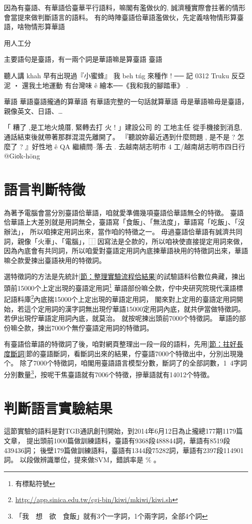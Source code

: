 \documentclass[final,oneside,onecolumn,12pt,a4paper]{book}%
\begin{document}
因為有臺語、有華語佮臺華平行語料，嘛閣有濫做伙的, 誠濟種實際會拄著的情形會當提來做判斷語言的語料。
有的時陣臺語佮華語濫做伙，先定義啥物情形算臺語，啥物情形算華語

用人工分

主要語句是臺語，有一兩个詞是華語嘛是算臺語
臺語

聽人講 khah 早有出現過『小蜜蜂』
我 beh tńg 來種作 ! ── 記 0312 Truku 反亞泥 ‧ 還我土地運動
有台灣味 ê 繪本──《我和我的腳踏車》 .

華語
華語臺語攏通的算華語
有華語完整的一句話就算華語
毋是華語嘛毋是臺語，親像英文、日語、…

「 糟了 ,是工地火燒厝, 緊轉去打 火 ! 」建設公司 的 工地主任 從手機接到消息,通話結束後就帶著那群混混先離開了。
『聽說妳最近遇到什麼問題 , 是不是 ? 怎麼了 ? 』好性地 ê QA 繼續問--落-去 .
去越南胡志明市 4 工/越南胡志明市四日行 @Gio̍k-hōng


\section{語言判斷特徵}
\label{節：語言判斷特徵}
為著予電腦會當分別臺語佮華語，咱就愛準備幾項臺語佮華語無仝的特徵。
臺語佮華語上大差別就是用詞無仝，臺語寫「食飯」、「無法度」，華語寫「吃飯」、「沒辦法」，
所以咱揀定用詞出來，當作咱的特徵之一。
毋過臺語佮華語有誠濟共同詞，親像「火車」、「電腦」，⿰因寫法是仝款的，所以咱袂使直接提定用詞來做，因為內底會有共同詞，所以咱愛對臺語定用詞內底揀華語袂用的特徵詞出來，華語嘛仝款愛揀出臺語袂用的特徵詞。

選特徵詞的方法是先統計\ref{節：整理實驗流程佮結果}的試驗語料佮數位典藏，揀出頭前15000个上定出現的臺語定用詞\footnote{有標點符號}
華語部份嘛仝款，佇中央研究院現代漢語標記語料庫\footnote{\url{http://app.sinica.edu.tw/cgi-bin/kiwi/mkiwi/kiwi.sh}}內底揣15000个上定出現的華語定用詞，
閣來對上定用的臺語定用詞開始，若這个定用詞的漢字詞無出現佇華語15000定用詞內底，就共伊當做特徵詞。
若伊出現佇華語定用詞內底，就莫治。
就按呢揀出頭前7000个特徵詞。
華語的部份嘛仝款，揀出7000个無佇臺語定用詞的特徵詞。


有臺語佮華語的特徵詞了後，咱對網頁整理出一段一段的語料，先用\ref{節：拄好長度斷詞}節的臺語斷詞，看斷詞出來的結果，佇臺語7000个特徵出中，分別出現幾个。
除了7000个特徵詞，咱閣用臺語語言模型分數，斷詞了的全部詞數，1~4字詞分別數量\footnote{「我　想　欲　食飯」就有3个一字詞，1个兩字詞，全部4个詞}，按呢干焦臺語就有7006个特徵，摻華語就有14012个特徵。

\section{判斷語言實驗結果}
\label{節：判斷語言實驗結果}
這節實驗的語料是對TGB通訊創刊開始，到2014年6月12日為止攏總177期1179篇文章，
提出頭前1000篇做訓練語料，臺語有9368段488844詞，華語有8519段439436詞；
後壁179篇做訓練語料，臺語有1344段75282詞，華語有2397段114901詞。
以段做辨識單位，提來做SVM，錯誤率是 $\%$ 。
\end{document}
